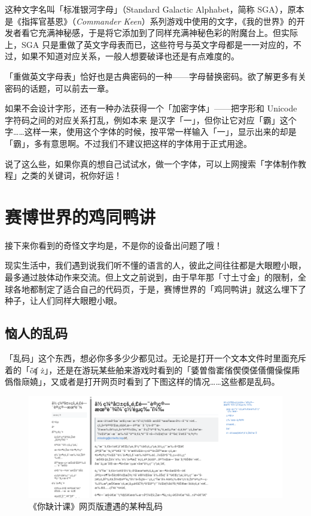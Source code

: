 这种文字名叫「标准银河字母」（Standard Galactic Alphabet，简称 SGA），原本是《指挥官基恩》（\textit{Commander Keen}）系列游戏中使用的文字，《我的世界》的开发者看它充满神秘感，于是将它添加到了同样充满神秘色彩的附魔台上。但实际上，SGA 只是重做了英文字母表而已，这些符号与英文字母都是一一对应的，不过，如果不知道对应关系，一般人想要破译也还是有点难度的。

\begin{note}
  「重做英文字母表」恰好也是古典密码的一种——字母替换密码。欲了解更多有关密码的话题，可以前去一章。
\end{note}

如果不会设计字形，还有一种办法获得一个「加密字体」——把字形和 Unicode 字符码之间的对应关系打乱，例如本来  是汉字「一」，但你让它对应「霸」这个字……这样一来，使用这个字体的时候，按平常一样输入「一」，显示出来的却是「霸」，多有意思啊。不过我们不建议把这样的字体用于正式用途。

说了这么些，如果你真的想自己试试水，做一个字体，可以上网搜索「字体制作教程」之类的关键词，祝你好运！

\section{赛博世界的鸡同鸭讲}

\begin{warning}
  接下来你看到的奇怪文字均是，不是你的设备出问题了哦！
\end{warning}

现实生活中，我们遇到说我们听不懂的语言的人，彼此之间往往都是大眼瞪小眼，最多通过肢体动作来交流。但上文之前说到，由于早年那「寸土寸金」的限制，全球各地都制定了适合自己的代码页，于是，赛博世界的「鸡同鸭讲」就这么埋下了种子，让人们同样大眼瞪小眼。

\subsection{恼人的乱码}

「乱码」这个东西，想必你多多少少都见过。无论是打开一个文本文件时里面充斥着的「\replacesymb\replacesymb{}ȱʧ\replacesymb\replacesymb\replacesymb\replacesymb{} \replacesymb{}ż\replacesymb\replacesymb\replacesymb\replacesymb\replacesymb\replacesymb」，还是在游玩某些舶来游戏时看到的「婱曽偺寚偗偰偄傞僐儞僺儏乕僞偺庼嬈」，又或者是打开网页时看到了下图这样的情况……这些都是乱码。

\begin{figure}[htb!]
  \centering
  \includegraphics[width=.8\textwidth]{assets/advanced/MissingButWindows1252.png}
  \caption{《你缺计课》网页版遭遇的某种乱码}
  \label{fig:MissingButWindows1252}
\end{figure}

